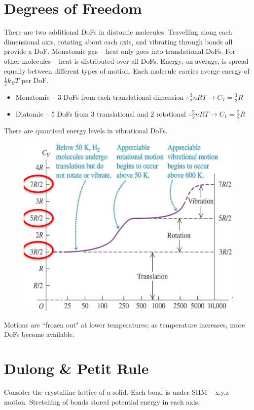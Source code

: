 \documentclass[a4paper, 11pt, normalem]{report}
\begin{document}
\section{Degrees of Freedom}
There are two additional DoFs in diatomic molecules.
Travelling along each dimensional axis, rotating about each axis, and vibrating through bonds all provide a DoF.
Monatomic gas -- heat only goes into translational DoFs.
For other molecules -- heat is distributed over all DoFs.
Energy, on average, is spread equally between different types of motion.
Each molecule carries averge energy of $\frac{1}{2}k_{B}T$ per DoF.
\begin{itemize}
    \item Monatomic -- 3 DoFs from each translational dimension $\therefore \frac{3}{2}nRT \rightarrow C_{V} = \frac{3}{2}R$ 
    \item Diatomic -- 5 DoFs from 3 translational and 2 rotational $\therefore \frac{5}{2}nRT \rightarrow C_{V} = \frac{5}{2}R$ 
\end{itemize}
There are quantised energy levels in vibrational DoFs.
\begin{figure}[H]
    \centering
    \includegraphics[scale=0.8]{Vibration.jpg}
\end{figure}
Motions are ``frozen out" at lower temperatures; as temperature increases, more DoFs become available.

\section{Dulong \& Petit Rule}
Consider the crystalline lattice of a solid.
Each bond is under SHM -- x,y,z motion.
Stretching of bonds stored potential energy in each axis.
\end{document}
